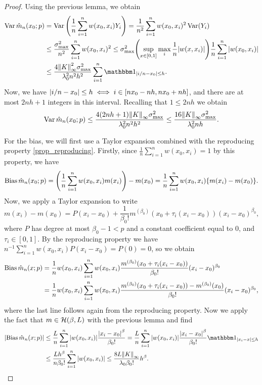 \begin{proof}
	Using the previous lemma, we obtain
	\begin{align*}
		\Var \hat m_n(x_0;p) &= \Var\qty(\frac1n \sum_{i=1}^n w(x_0, x_i) Y_i) = \frac1{n^2} \sum_{i=1}^n w(x_0, x_i)^2 \Var(Y_i) \\
		&\leq \frac{\sigma_\Rm{max}^2}{n^2} \sum_{i=1}^n w(x_0, x_i)^2  \leq \sigma_\Rm{max}^2 \qty(\sup_{x \in [0, 1]} \max_i \frac1n \abs{w(x, x_i)}) \frac1n \sum_{i=1}^n \abs{w(x_0, x_i)} \\
		&\leq \frac{4 \norm{K}_\infty^2 \sigma_\Rm{max}^2}{\lambda_0^2 n^2 h^2} \sum_{i=1}^n \ind_{\abs{i/n - x_0} \leq h}.
	\end{align*}
Now, we have $\abs{i/n - x_0} \leq h \iff i \in [n x_0 - nh, n x_0 + nh]$, and there are at most $2nh + 1$ integers in this interval. Recalling that $1 \leq 2nh$ we obtain 
\[
\operatorname{Var} \hat m_n(x_0; p) \leq \frac{4(2nh + 1) \norm{K}_\infty \sigma_\mathrm{max}^2}{\lambda_0^2 n^2 h^2} \leq \frac{16 \norm{K}_\infty \sigma_\mathrm{max}^2}{\lambda_0^2 nh} . 
\]

For the bias, we will first use a Taylor expansion combined with the reproducing property \cref{prop_reproducing}. 
Firstly, since $\frac1n\sum_{i=1}^n w(x_0, x_i) = 1$ by this property, we have
\[
\operatorname{Bias} \hat m_n(x_0;p) = \qty(\frac1n \sum_{i=1}^n w(x_0, x_i) m(x_i)) - m(x_0) = \frac1n \sum_{i=1}^n w(x_0, x_i) \qty{m(x_i) - m(x_0)}.
\] 
Now, we apply a Taylor expansion to write \[
m(x_i) - m(x_0) = P(x_i - x_0) + \frac{1}{\beta_0!} m^{(\beta_0)}(x_0 + \tau_i(x_i - x_0)) (x_i - x_0)^{\beta_0}, 
\]
where $P$ has degree at most $\beta_0 - 1 < p$ and a constant coefficient equal to 0,  and $\tau_i \in [0, 1]$. By the reproducing property we have $n^{-1} \sum_{i=1}^n w(x_0, x_i) P(x_i - x_0) = P(0) = 0$, so we obtain
\begin{align*}
\operatorname{Bias} \hat m_n(x;p) &= \frac1n w(x_0, x_i) \sum_{i=1}^n w(x_0, x_i) \frac{m^{(\beta_0)}(x_0 + \tau_i(x_i - x_0))}{\beta_0!} (x_i - x_0)^{\beta_0} \\
&= \frac1n w(x_0, x_i) \sum_{i=1}^n w(x_0, x_i) \frac{m^{(\beta_0)}(x_0 + \tau_i(x_i - x_0)) - m^{(\beta_0)}(x_0)}{\beta_0!} (x_i - x_0)^{\beta_0},
\end{align*}
where the last line follows again from the reproducing property. Now we apply the fact that
$m \in \mathcal H(\beta, L)$ with the previous lemma and find
\begin{align*}
	\abs{\Bias \hat m_n(x;p)} &\leq \frac Ln \sum_{i=1}^n \abs{w(x_0, x_i)} \frac{\abs{x_i - x_0}^\beta}{\beta_0!} = \frac Ln \sum_{i=1}^n \abs{w(x_0, x_i)} \frac{\abs{x_i - x_0}^\beta}{\beta_0!} \ind_{\abs{x_i - x} \leq h} \\
	&\leq \frac{Lh^\beta}{n\beta_0!} \sum_{i=1}^n \abs{w(x_0, x_i)} \leq \frac{8 L \norm{K}_\infty}{\lambda_0 \beta_0!}h^\beta. 
\end{align*}
\end{proof}


